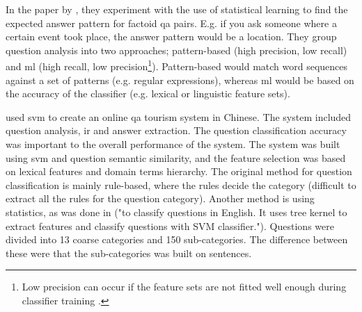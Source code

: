In the paper by \citet{Toba2011}, they experiment with the use of statistical learning to find the expected answer pattern for factoid \gls{qa} pairs. 
E.g. if you ask someone where a certain event took place, the answer pattern would be a location. 
They group question analysis into two approaches; pattern-based (high precision, low recall) and \gls{ml} (high recall, 
low precision\footnote{
	Low precision can occur if the feature sets are not fitted well enough during classifier training 
	\cite[p.~283]{Toba2011}.
	}). 
Pattern-based would match word sequences against a set of patterns (e.g. regular expressions), whereas \gls{ml} would be based on the accuracy of the classifier 
(e.g. lexical or linguistic feature sets). 
\begin{comment}
The retrieval of \gls{qa} pairs is done by using a statistical relation framework: Bayesian Analogical Reasoning (BAR). 
Features sets are then extracted from the training set by use of binary values checking if the question contains a given question word. 
The BAR framework then learns the related features and computes the estimation for them. 
Thereafter \gls{qa} pairs are retrieved from the testing set and compared against the training set. 
Afterwards, the \gls{qa} pairs that have identical question words are identified, and overlapping pairs are grouped according their named entity group.

To retrieve named entities, they used two different recognizers. 
The first was Stanford (extracts the person, organization and location), and the second was dictionary based (extract number entities and fine-grained noun-based entities). 

Question words were extracted by building a question word list from the training set (achieved by using Stanford Part-of-Speech (POS) tagger). 
Then for each question, look for the appearance of the question word to create the feature set.

Mapped named-entities; e.g. ORGANIZATION became NEorganization.
\end{comment}

\citet{Xu2012} used \gls{svm} to create an online \gls{qa} tourism system in Chinese. 
The system included question analysis, \gls{ir} and answer extraction. 
The question classification accuracy was important to the overall performance of the system. 
The system was built using \gls{svm} and question semantic similarity, and the feature selection was based on lexical features and domain terms hierarchy. 
The original method for question classification is mainly rule-based, where the rules decide the category (difficult to extract all the rules for the question category). 
Another method is using statistics, as was done in \cite{Zhang2003} ("to classify questions in English. It uses tree kernel to extract features and classify questions with SVM classifier."). 
Questions were divided into 13 coarse categories and 150 sub-categories. 
The difference between these were that the sub-categories was built on sentences.

